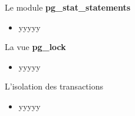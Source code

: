 
\begin{frame}[fragile]{Le module \textbf{pg\_stat\_statements}}


   \begin{itemize}
      \item yyyyy
   \end{itemize}

\begin{toile}
\end{toile}

\end{frame}


\begin{frame}[fragile]{La vue \textbf{pg\_lock}}


   \begin{itemize}
      \item yyyyy
   \end{itemize}

\begin{toile}
\end{toile}

\end{frame}


\begin{frame}[fragile]{L'isolation des transactions}


   \begin{itemize}
      \item yyyyy
   \end{itemize}

\begin{toile}
\end{toile}

\end{frame}

